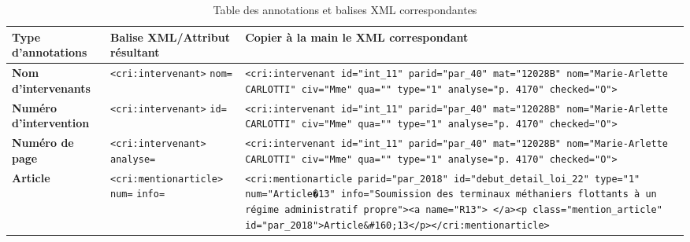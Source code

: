 \begin{table}[ht]
    \centering
    \begin{adjustbox}{max width=\textwidth}
    \begin{tabular}{|l|l|p{8cm}|} %
        \hline
        \textbf{Type d'annotations} & \textbf{Balise XML/Attribut résultant} & \textbf{Copier à la main le XML correspondant} \\ \hline
        \textbf{Nom d’intervenants} & \verb|<cri:intervenant>| \verb|nom=| & \lstinline|<cri:intervenant id="int_11" parid="par_40" mat="12028B" nom="Marie-Arlette CARLOTTI" civ="Mme" qua="" type="1" analyse="p. 4170" checked="O">| \\ \hline
        \textbf{Numéro d'intervention} & \verb|<cri:intervenant>| \verb|id=| & \lstinline|<cri:intervenant id="int_11" parid="par_40" mat="12028B" nom="Marie-Arlette CARLOTTI" civ="Mme" qua="" type="1" analyse="p. 4170" checked="O">| \\ \hline
        \textbf{Numéro de page} & \verb|<cri:intervenant>| \verb|analyse=| & \lstinline|<cri:intervenant id="int_11" parid="par_40" mat="12028B" nom="Marie-Arlette CARLOTTI" civ="Mme" qua="" type="1" analyse="p. 4170" checked="O">| \\ \hline
        \textbf{Article} & \verb|<cri:mentionarticle>| \verb|num=| \verb|info=| & \lstinline|<cri:mentionarticle parid="par_2018" id="debut_detail_loi_22" type="1" num="Article�13" info="Soumission des terminaux méthaniers flottants à un régime administratif propre"><a name="R13"> </a><p class="mention_article" id="par_2018">Article&#160;13</p></cri:mentionarticle>| \\ \hline
    \end{tabular}
    \end{adjustbox}
    \caption{Table des annotations et balises XML correspondantes}
\end{table}





